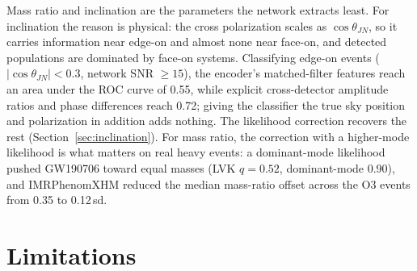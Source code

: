 \documentclass[twocolumn,linenumbers]{aastex701}
\begin{document}
Mass ratio and inclination are the parameters the network extracts least.
For inclination the reason is physical: the cross polarization scales as
$\cos\theta_{JN}$, so it carries information near edge-on and almost none near
face-on, and detected populations are dominated by face-on systems. Classifying
edge-on events ($|\cos\theta_{JN}|<0.3$, network SNR $\geq15$), the encoder's
matched-filter features reach an area under the ROC curve of 0.55, while
explicit cross-detector amplitude ratios and phase differences reach 0.72;
giving the classifier the true sky position and polarization in addition adds
nothing. The likelihood correction recovers the rest
(Section~\ref{sec:inclination}). For mass ratio, the correction with a
higher-mode likelihood is what matters on real heavy events: a dominant-mode
likelihood pushed GW190706 toward equal masses (LVK $q=0.52$, dominant-mode
0.90), and IMRPhenomXHM reduced the median mass-ratio offset across the O3
events from 0.35 to 0.12\,sd.

\section{Limitations} \label{sec:limits}
\end{document}
